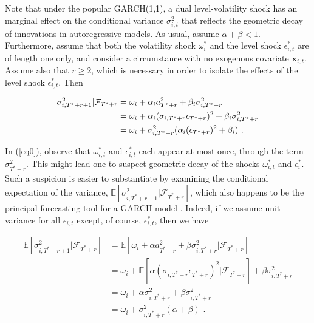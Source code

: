 \documentclass[11pt,3p,review,authoryear]{elsarticle}
\newcommand{\x}{\textbf{x}}
\theoremstyle{definition}
\begin{document}
Note that under the popular GARCH(1,1), a dual level-volatility shock has an marginal effect on the conditional variance $\sigma^{2}_{i,t}$ that reflects the geometric decay of innovations in autoregressive models.  As usual, assume $\alpha+\beta < 1$.  Furthermore, assume that both the volatility shock $\omega^{*}_{i}$ and the level shock $\epsilon^{*}_{i,t}$ are of length one only, and consider a circumstance with no exogenous covariate $\x_{i,t}$. Assume also that $r\geq 2$, which is necessary in order to isolate the effects of the level shock $\epsilon^{*}_{i,t}$.  Then

\begin{align}
\sigma^{2}_{i,T^{*}+r+1} | \mathcal{F}_{T^{*}+r} & = \omega_{i} + \alpha_{i} a_{T^{*}+r}^{2} + \beta_{i}\sigma^{2}_{i,T^{*}+r} \label{eq0}\\
& = \omega_{i} + \alpha_{i}(\sigma_{i,T^{*}+r}\epsilon_{T^{*}+r})^{2} + \beta_{i}\sigma^{2}_{i,T^{*}+r}\notag \\
& = \omega_{i} + \sigma^{2}_{i,T^{*}+r}(\alpha_{i} (\epsilon_{T^{*}+r})^{2} + \beta_{i}) \text{ .}\notag 
\end{align}

In (\ref{eq0}), observe that $\omega_{i,t}^{*}$ and $\epsilon^{*}_{i,t}$ each appear at most once, through the term $\sigma^{2}_{T^{*}+r}$.  This might lead one to suspect  geometric decay of the shocks $\omega_{i,t}^{*}$ and $\epsilon^{*}_{i}$.  Such a suspicion is easier to substantiate by examining the conditional expectation of the variance, $\mathbb{E}[ \sigma^{2}_{i,T^{*}+r+1} |\mathcal{F}_{T^{*}+r}]$, which also happens to be the principal forecasting tool for a GARCH model \citep{zivot2009practical}.  Indeed, if we assume unit variance for all $\epsilon_{i,t}$ except, of course, $\epsilon^{*}_{i,t}$, then we have

\begin{align*}
\mathbb{E}[ \sigma^{2}_{i,T^{*}+r+1} |\mathcal{F}_{T^{*}+r}] & = \mathbb{E}[\omega_{i} + \alpha a_{T^{*}+r}^{2} + \beta\sigma^{2}_{i,T^{*}+r} |\mathcal{F}_{T^{*}+r}] \\
& = \omega_{i} + \mathbb{E}[\alpha(\sigma_{i,T^{*}+r}\epsilon_{T^{*}+r})^{2} |\mathcal{F}_{T^{*}+r}] + \beta\sigma^{2}_{i,T^{*}+r} \\
& = \omega_{i} + \alpha\sigma_{i,T^{*}+r}^{2} + \beta\sigma^{2}_{i,T^{*}+r} \tag{Due to the unit variance assumption}\\
& = \omega_{i} + \sigma^{2}_{i,T^{*}+r}(\alpha + \beta) \text{ .} \\
\end{align*}
\end{document}
